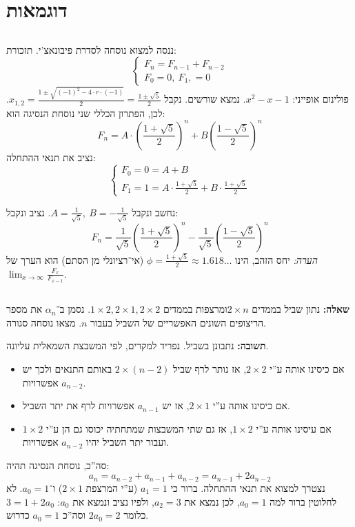 \documentclass[]{article}
\newcommand\limi  {\lim_{x \to \infty}}
\begin{document}
	\section{דוגמאות}
	\subsection{}
	ננסה למצוא נוסחה לסדרת פיבונאצ'י. תזכורת: 
	\[ \begin{cases}
		F_n = F_{n - 1} + F_{n - 2} \\
		 F_0 = 0, \ F_1, = 0
	\end{cases} \]
	פולינום אופייני: $x^2 - x - 1 $. נמצא שורשים. נקבל $x_{1, 2} = \frac{1 \pm \sqrt{(-1)^2 - 4 \cdot r \cdot (-1)}}{2} = \frac{1 \pm \sqrt{5}}{2}$. לכן, הפתרון הכללי שני נוסחת הנסיגה הוא: 
	\[ F_n = A \cdot \left (\frac{1 + \sqrt5}{2}\right )^n + B \left (\frac{1 - \sqrt5}{2}\right )^n \]
	נציב את תנאי ההתחלה: 
	\[ \begin{cases}
		F_0 = 0 = A + B \\
		F_1 = 1 = A \cdot \frac{1 + \sqrt 5}{2} + B \cdot \frac{1 + \sqrt 5}{2}
	\end{cases} \]
	
	נחשב ונקבל $A = \frac{1}{\sqrt 5}, \ B = - \frac{1}{\sqrt5}$. נציב ונקבל: 
	\[ F_n = \frac{1}{\sqrt5}\left (\frac{1 + \sqrt5}{2} \right )^n - \frac{1}{\sqrt 5}\left (\frac{1 - \sqrt 5}{2}\right )^n \]
	\textit{הערה: }יחס הזהב, הינו $\phi = \frac{1 + \sqrt5}{2} \approx 1.618 \dots$ (אי־רציונלי מן הסתם) הוא הערך של $\limi \frac{F_x}{F_{x - 1}}$. 
	
	\subsection{}
	\textbf{שאלה: }נתון שביל בממדים $2 \times n $ומרצפות בממדים $1 \times 2, 2 \times 1, 2 \times 2$. נסמן ב‏־$\alpha_n$ את מספר הריצופים השונים האפשריים של השביל בעבור $n$. מצאו נוסחה סגורה.                                                              
	                                                                                        
	\textbf{תשובה: }נתבונן בשביל. נפריד למקרים, לפי המשבצת השמאלית עליונה. 
	\begin{itemize}
		\item אם כיסינו אותה ע''י $2 \times 2$, אז נותר לרף שביל $2 \times (n - 2)$ באותם התנאים ולכך יש $a_{n - 2}$ אפשרויות. 
		\item אם כיסינו אותה ע''י $2 \times 1$, אז יש $a_{n - 1}$ אפשרויות לרף את יתר השביל. 
			\item אם עיסינו אותה ע''י $1 \times 2$, אז גם שתי המשבצות שמתחתיה יכוסו גם הן ע''י $1 \times 2$ ועבור יתר השביל יהיו $a_{n - 2}$ אפשרויות. 
	\end{itemize}
	סה''כ, נוסחת הנסיגה תהיה: 
	\[ a_n = a_{n - 2} + a_{n - 1} + a_{n - 2} = a_{n - 1} + 2a_{n - 2} \]
	נצטרך למצוא את תנאי ההתחלה. ברור כי $a_1 = 1 $ (ע''י המרצפת $2 \times 1 $) ו־$a_0 = 1 $. לא לחלוטין ברור למה $a_0 = 1 $, לכן נמצא את $a_2 = 3 $, ולפיו נציב ונמצא את $a_0 $: $3 = 1 + 2a_0$ כלומר $2a_0 = 2 $ וסה''כ $a_0 = 1$ כדרוש. 
	
\end{document}
